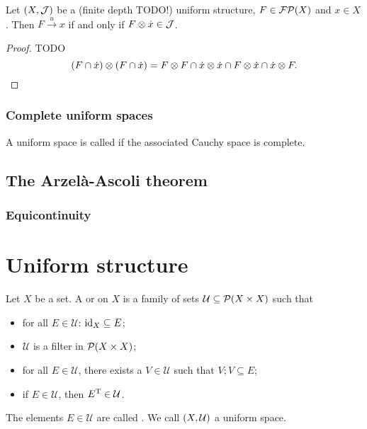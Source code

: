 \begin{proposition}
Let $\left( X, \mathcal{J} \right)$ be a (finite depth TODO!) uniform structure, $F\in \operatorname{\mathcal{FP}}(X)$ and $x\in X$. Then $F\overset{u}{\to} x$ \textup{if and only if} $F \otimes \dot{x} \in \mathcal{J}$.
\end{proposition}
\begin{proof}
TODO
\[ (F\cap \dot{x})\otimes (F\cap \dot{x}) = F\otimes F \cap \dot{x}\otimes \dot{x} \cap F\otimes\dot{x} \cap \dot{x}\otimes F. \]
\end{proof}


\subsubsection{Complete uniform spaces}
\begin{definition}
A uniform space is called  if the associated Cauchy space is complete.
\end{definition}

\subsection{The Arzelà-Ascoli theorem}
\subsubsection{Equicontinuity}
\begin{definition}

\end{definition}

\section{Uniform structure}
\begin{definition}
Let $X$ be a set. A  or  on $X$ is a family of sets $\mathcal{U} \subseteq \operatorname{\mathcal{P}}(X\times X)$ such that
\begin{itemize}
\item for all $E\in \mathcal{U}$: $\operatorname{id}_X \subseteq E$;
\item $\mathcal{U}$ is a filter in $\operatorname{\mathcal{P}}(X\times X)$;
\item for all $E\in\mathcal{U}$, there exists a $V\in \mathcal{U}$ such that $V;V \subseteq E$;
\item if $E\in\mathcal{U}$, then $E^{\mathrm{T}}\in\mathcal{U}$.
\end{itemize}
The elements $E\in \mathcal{U}$ are called . We call $\left( X,\mathcal{U} \right)$ a uniform space.
\end{definition}

